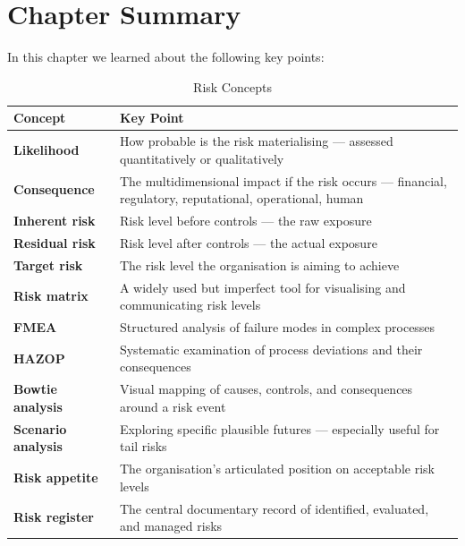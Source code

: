 \section{Chapter Summary}
In this chapter we learned about the following key points:
\begin{table}[H]
  \centering
  \renewcommand{\arraystretch}{1.5}
  \begin{tabularx}{\textwidth}{ | >{\raggedright\arraybackslash}p{} 
                                | >{\raggedright\arraybackslash}X | }
    \hline
    \textbf{Concept} & \textbf{Key Point} \\
    \hline
    \textbf{Likelihood} & How probable is the risk materialising — assessed quantitatively or qualitatively\\
    \hline
    \textbf{Consequence} & The multidimensional impact if the risk occurs — financial, regulatory, reputational, operational, human\\
    \hline
    \textbf{Inherent risk} & Risk level before controls — the raw exposure\\
    \hline
    \textbf{Residual risk} & Risk level after controls — the actual exposure\\
    \hline
    \textbf{Target risk} & The risk level the organisation is aiming to achieve\\
    \hline
    \textbf{Risk matrix} & A widely used but imperfect tool for visualising and communicating risk levels\\
    \hline
    \textbf{FMEA} & Structured analysis of failure modes in complex processes\\
    \hline
    \textbf{HAZOP} & Systematic examination of process deviations and their consequences\\
    \hline
    \textbf{Bowtie analysis} & Visual mapping of causes, controls, and consequences around a risk event\\
    \hline
    \textbf{Scenario analysis} & Exploring specific plausible futures — especially useful for tail risks\\
    \hline
    \textbf{Risk appetite} & The organisation's articulated position on acceptable risk levels\\
    \hline
    \textbf{Risk register} & The central documentary record of identified, evaluated, and managed risks\\
    \hline
  \end{tabularx}
  \caption{Risk Concepts}
\end{table}

